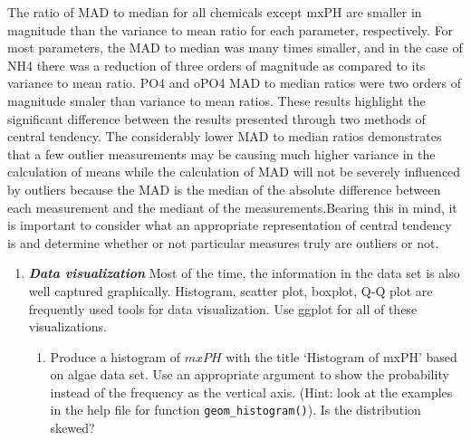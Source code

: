\documentclass[]{article}
\newenvironment{Shaded}{\begin{snugshade}}{\end{snugshade}}
\newcommand{\KeywordTok}[1]{\textcolor[rgb]{0.13,0.29,0.53}{\textbf{#1}}}
\newcommand{\DataTypeTok}[1]{\textcolor[rgb]{0.13,0.29,0.53}{#1}}
\newcommand{\StringTok}[1]{\textcolor[rgb]{0.31,0.60,0.02}{#1}}
\newcommand{\OtherTok}[1]{\textcolor[rgb]{0.56,0.35,0.01}{#1}}
\newcommand{\ControlFlowTok}[1]{\textcolor[rgb]{0.13,0.29,0.53}{\textbf{#1}}}
\newcommand{\OperatorTok}[1]{\textcolor[rgb]{0.81,0.36,0.00}{\textbf{#1}}}
\newcommand{\NormalTok}[1]{#1}
\providecommand{\tightlist}{%
  \setlength{\itemsep}{0pt}\setlength{\parskip}{0pt}}
\begin{document}
\begin{Shaded}
\end{Shaded}

The ratio of MAD to median for all chemicals except mxPH are smaller in
magnitude than the variance to mean ratio for each parameter,
respectively. For most parameters, the MAD to median was many times
smaller, and in the case of NH4 there was a reduction of three orders of
magnitude as compared to its variance to mean ratio. PO4 and oPO4 MAD to
median ratios were two orders of magnitude smaler than variance to mean
ratios. These results highlight the significant difference between the
results presented through two methods of central tendency. The
considerably lower MAD to median ratios demonstrates that a few outlier
measurements may be causing much higher variance in the calculation of
means while the calculation of MAD will not be severely influenced by
outliers because the MAD is the median of the absolute difference
between each measurement and the mediant of the measurements.Bearing
this in mind, it is important to consider what an appropriate
representation of central tendency is and determine whether or not
particular measures truly are outliers or not.

\begin{enumerate}
\def\labelenumi{\arabic{enumi}.}
\setcounter{enumi}{1}
\item
  \textbf{\emph{Data visualization}} Most of the time, the information
  in the data set is also well captured graphically. Histogram, scatter
  plot, boxplot, Q-Q plot are frequently used tools for data
  visualization. Use ggplot for all of these visualizations.

  \begin{enumerate}
  \tightlist
  \item
    Produce a histogram of \(mxPH\) with the title `Histogram of mxPH'
    based on algae data set. Use an appropriate argument to show the
    probability instead of the frequency as the vertical axis. (Hint:
    look at the examples in the help file for function
    \texttt{geom\_histogram()}). Is the distribution skewed?
  \end{enumerate}
\end{enumerate}
\end{document}
